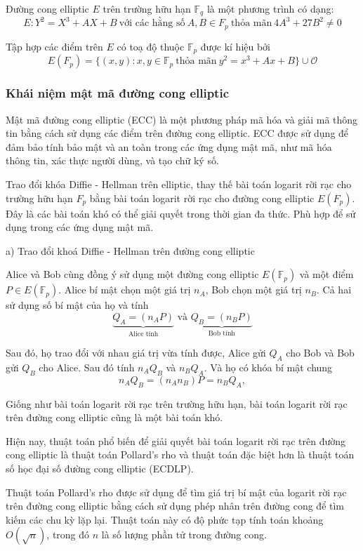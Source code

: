 Đường cong elliptic $E$ trên trường hữu hạn $\mathbb{F}_q$ là một phương trình có dạng:
$$E: Y^2 = X^3 + AX + B\ \text{với các hằng số}\ A, B \in F_p\ \text{thỏa mãn}\ 4A^3 + 27B^2 \neq 0$$

Tập hợp các điểm trên $E$ có toạ độ thuộc $\mathbb{F} _p$ được kí hiệu bởi
$$E(F_p) = \{(x, y) : x, y \in \mathbb{F}_p\ \text{thỏa mãn}\ y^2 = x^3 + A x + B\} \cup \mathcal{O}$$

\subsubsection{Khái niệm mật mã đường cong elliptic}
Mật mã đường cong elliptic (ECC) 
là một phương pháp mã hóa và giải mã thông tin bằng cách sử dụng các 
điểm trên đường cong elliptic. ECC được sử dụng để đảm bảo tính bảo 
mật và an toàn trong các ứng dụng mật mã, như mã hóa thông tin, xác thực người dùng, và tạo chữ ký số.

Trao đổi khóa Diffie - Hellman trên elliptic, thay thế bài toán logarit rời
rạc cho trường hữu hạn $F_p$ bằng bài toán logarit rời rạc cho đường cong elliptic $E(F_p)$.
Đây là các bài toán khó có thể giải quyết trong thời gian đa thức. Phù 
hợp để sử dụng trong các ứng dụng mật mã.

a) Trao đổi khoá Diffie - Hellman trên đường cong elliptic

	Alice và Bob cùng đồng ý sử dụng một đường cong elliptic $E (\mathbb{F}_p)$ và một điểm $P \in E (\mathbb{F}_p)$.
	Alice bí mật chọn một giá trị $n_A$, Bob chọn một giá trị $n_B$. Cả hai sử dụng số bí mật của họ và tính
$$\underbrace{Q_A = (n_AP)}_{\text{Alice tính}} \text{ và } \underbrace{Q_B = (n_BP)}_{\text{Bob tính}}$$

Sau đó, họ trao đổi với nhau giá trị vừa tính được, Alice gửi $Q_A$ cho Bob và Bob gửi
$Q_B$ cho Alice. Sau đó tính $n_A Q_B$ và $ n_BQ_A $.
Và họ có khóa bí mật chung
$$ n_AQ_B = (n_An_B)P = n_BQ_A,$$

Giống như bài toán logarit rời rạc trên trường hữu hạn, bài toán logarit rời rạc trên đường cong elliptic 
cũng là một bài toán khó. 

Hiện nay, thuật toán phổ biến để giải quyết bài toán logarit rời rạc 
trên đường cong elliptic là thuật toán Pollard's rho và thuật toán 
đặc biệt hơn là thuật toán số học đại số đường cong elliptic (ECDLP).

Thuật toán Pollard's rho được sử dụng để tìm giá trị bí mật của 
logarit rời rạc trên đường cong elliptic bằng cách sử dụng phép 
nhân trên đường cong để tìm kiếm các chu kỳ lặp lại. Thuật toán này 
có độ phức tạp tính toán khoảng $O(\sqrt n)$, trong đó $n$ là số lượng 
phần tử trong đường cong.

